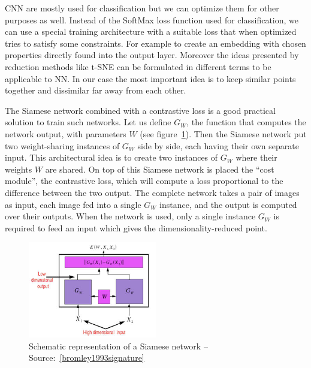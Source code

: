 \documentclass[a4paper,12pt]{report}
\begin{document}
CNN are mostly used for classification but we can optimize them for other purposes as well.
Instead of the SoftMax loss function used for classification, we can use a special training architecture with a suitable loss that when optimized tries to satisfy some constraints.
For example to create an embedding with chosen properties directly found into the output layer.
Moreover the ideas presented by reduction methods like t-SNE can be formulated in different terms to be applicable to NN.
In our case the most important idea is to keep similar points together and dissimilar far away from each other.

The Siamese network combined with a contrastive loss is a good practical solution to train such networks\cite{bromley1993signature}\cite{chopra2005learning}.
Let us define $G_W$, the function that computes the network output, with parameters $W$ (see figure~\ref{fig:siamese_network}).
Then the Siamese network put two weight-sharing instances of $G_W$ side by side, each having their own separate input.
This architectural idea is to create two instances of $G_W$ where their weights $W$ are shared.
On top of this Siamese network is placed the ``cost module'', the contrastive loss, which will compute a loss proportional to the difference between the two output.
The complete network takes a pair of images as input, each image fed into a single $G_W$ instance, and the output is computed over their outputs.
When the network is used, only a single instance $G_W$ is required to feed an input which gives the dimensionality-reduced point.

\begin{figure}[t]
    \begin{center}
        \includegraphics[width=0.5\textwidth]{thesis_figures/siamese_network.jpg}
    \end{center}
    \caption{Schematic representation of a Siamese network -- Source:~\ref{bromley1993signature}}
    \label{fig:siamese_network}
\end{figure}
\end{document}
